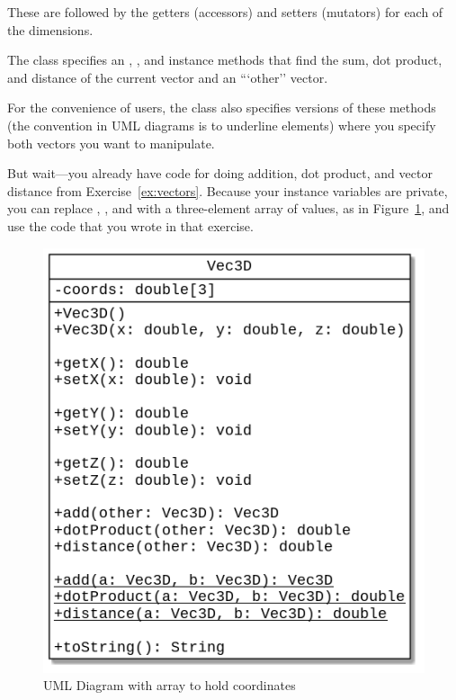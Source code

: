 \begin{exercise}
These are followed by the getters (accessors) and setters (mutators) for each of the dimensions. 

The class specifies an , , and  instance methods that find the sum, dot product, and distance of the current vector and an ```other'' vector.

For the convenience of users, the class also specifies  versions of these methods (the convention in UML diagrams is to underline  elements) where you specify both vectors you want to manipulate.


But wait---you already have code for doing addition, dot product, and vector distance from Exercise~\ref{ex:vectors}. Because your instance variables are private, you can replace , , and  with a three-element array of  values, as in Figure~\ref{fig.vec3d_b}, and use the code that you wrote in that exercise.

\begin{figure}[!h]
\begin{center}
\includegraphics[scale=0.5]{figs/vec3d_b.png}
\caption{UML Diagram with array to hold coordinates}
\label{fig.vec3d_b}
\end{center}
\end{figure}


\end{exercise}
